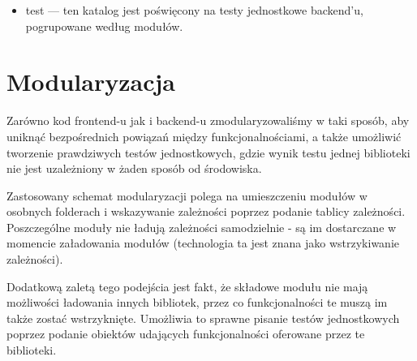 \documentclass[a4paper,twoside,openright,11pt]{report}
\begin{document}
\begin {itemize}
\begin {itemize}
\begin {itemize}
\begin {itemize}
	  \item console --- kod źródłowy konsoli wyjścia danych, zlokalizowanej w dolnej części strony.
	  \item data\_structures --- tutaj zdefiniowane sa wszystkie struktury danych, jakie możemy wizualizować, funkcje które je wyświetlają, wywoływane przez backend w trakcie procedury odświeżającej widok.
	  \item interface --- w tym katalogu znajduje się kod odpowiedzialny za obsługę zdarzeń, obsługę przycisków i pętli cyklicznie wykonującej kolejny krok programu a także inicjalizacja środowiska po stronie frontend'u.
	  \item visual\_elements (variable) --- to miejsce jest przeznaczone na podstawowe, niepodzielne elementy graficznej wizualizacji. Jedynym stworzonym w ramach tej pracy jest element variable, reprezentujący pojedyńczą zmienną. 
	  \item visualization --- zawiera główny plik frontend'u odpowiadający za najbardziej wysokopoziomowe zadania, opisuje interfejs dla backend'u, implementuje funckę update aktualizującą wizualizacje i redraw wyświetlającą wizualizacje. Określa też logikę przydzielania miejsca dla poszczególnych typu wizualizacji (tablic, zmiennych itp \ldots).
	\end {itemize}
	\item index.html --- główny plik określający wygląd strony, punnkt wejściowy dla serwera hostującego. Importuje wszystkie pozostałe pliki używane w aplikacji.
      \end {itemize}
    \item test --- ten katalog jest poświęcony na testy jednostkowe backend'u, pogrupowane według modułów.
    \end {itemize}
  \end{itemize}

  \section{Modularyzacja}
\par Zarówno kod frontend-u jak i backend-u zmodularyzowaliśmy w taki sposób, aby uniknąć bezpośrednich powiązań między funkcjonalnościami, a także umożliwić tworzenie prawdziwych testów
jednostkowych, gdzie wynik testu jednej biblioteki nie jest uzależniony w żaden sposób od środowiska. 
\par Zastosowany schemat modularyzacji polega na umieszczeniu modułów w osobnych folderach i wskazywanie zależności poprzez podanie tablicy zależności. Poszczególne moduły nie ładują zależności samodzielnie - są im dostarczane w momencie załadowania modułów (technologia ta jest znana jako wstrzykiwanie zależności).
\par Dodatkową zaletą tego podejścia jest fakt, że składowe modułu nie mają możliwości ładowania innych bibliotek, przez co funkcjonalności te muszą im także zostać wstrzyknięte. Umożliwia to
sprawne pisanie testów jednostkowych poprzez podanie obiektów udających funkcjonalności oferowane przez te biblioteki.
\end{document}
